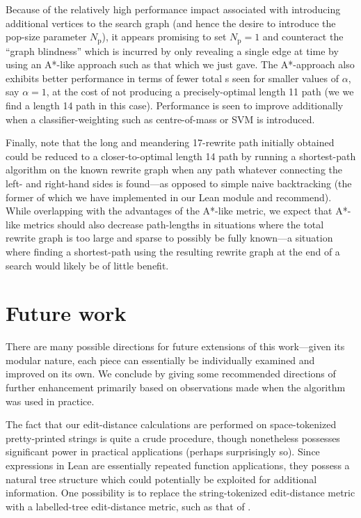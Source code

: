 \documentclass[12pt]{easychair}
\begin{document}
Because of the relatively high performance impact associated with introducing additional \expr{} vertices to the search graph (and hence the desire to introduce the pop-size parameter $N_\text{p}$), it appears promising to set $N_\text{p} = 1$ and counteract the ``graph blindness'' which is incurred by only revealing a single edge at time by using an A*-like approach such as that which we just gave. The A*-approach also exhibits better performance in terms of fewer total \expr{}s seen for smaller values of $\alpha$, say $\alpha = 1$, at the cost of not producing a precisely-optimal length 11 path (we we find a length 14 path in this case). Performance is seen to improve additionally when a classifier-weighting such as centre-of-mass or SVM is introduced.

Finally, note that the long and meandering 17-rewrite path initially obtained could be reduced to a closer-to-optimal length 14 path by running a shortest-path algorithm on the known rewrite graph when any path whatever connecting the left- and right-hand sides is found---as opposed to simple naive backtracking (the former of which we have implemented in our Lean module and recommend). While overlapping with the advantages of the A*-like metric, we expect that A*-like metrics should also decrease path-lengths in situations where the total rewrite graph is too large and sparse to possibly be fully known---a situation where finding a shortest-path using the resulting rewrite graph at the end of a search would likely be of little benefit.

\section{Future work}

There are many possible directions for future extensions of this work---given its modular nature, each piece can essentially be individually examined and improved on its own. We conclude by giving some recommended directions of further enhancement primarily based on observations made when the algorithm was used in practice.

The fact that our edit-distance calculations are performed on space-tokenized pretty-printed strings is quite a crude procedure, though nonetheless possesses significant power in practical applications (perhaps surprisingly so). Since expressions in Lean are essentially repeated function applications, they possess a natural tree structure which could potentially be exploited for additional information. One possibility is to replace the string-tokenized edit-distance metric with a labelled-tree edit-distance metric, such as that of \cite{pawlik2011rted}.
\end{document}
